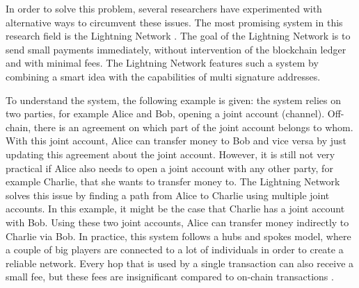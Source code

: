 In order to solve this problem, several researchers have experimented with alternative ways to circumvent these issues. The most promising system in this research field is the Lightning Network \cite{poon2016bitcoin}. The goal of the Lightning Network is to send small payments immediately, without intervention of the blockchain ledger and with minimal fees. The Lightning Network features such a system by combining a smart idea with the capabilities of multi signature addresses. 

To understand the system, the following example is given: the system relies on two parties, for example Alice and Bob, opening a joint account (channel). Off-chain, there is an agreement on which part of the joint account belongs to whom. With this joint account, Alice can transfer money to Bob and vice versa by just updating this agreement about the joint account. However, it is still not very practical if Alice also needs to open a joint account with any other party, for example Charlie, that she wants to transfer money to. The Lightning Network solves this issue by finding a path from Alice to Charlie using multiple joint accounts. In this example, it might be the case that Charlie has a joint account with Bob. Using these two joint accounts, Alice can transfer money indirectly to Charlie via Bob. In practice, this system follows a hubs and spokes model, where a couple of big players are connected to a lot of individuals in order to create a reliable network. Every hop that is used by a single transaction can also receive a small fee, but these fees are insignificant compared to on-chain transactions \cite{poon2016bitcoin}.

